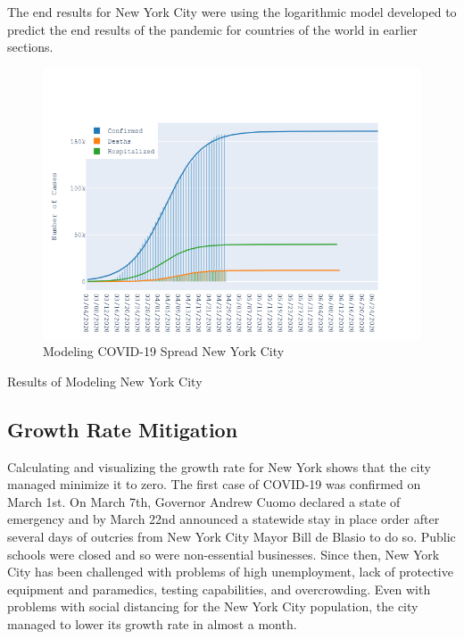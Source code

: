 \documentclass{homework}
\begin{document}
The end results for New York City were using the logarithmic model developed to predict the end results of the pandemic for countries of the world in earlier sections. 

\begin{figure}[H]
  \centering
  \includegraphics[scale=0.45]{task5/modeling.png}
  \caption{Modeling COVID-19 Spread New York City}
\end{figure}

\begin{table}[H]
  \caption{Results of Modeling New York City}
  \label{Task 5 New York City}
  \centering
  
\end{table}

\newpage
\subsection{Growth Rate Mitigation} 

Calculating and visualizing the growth rate for New York shows that the city managed minimize it to zero. The first case of COVID-19 was confirmed on March 1st. On March 7th, Governor Andrew Cuomo declared a state of emergency and by March 22nd announced a statewide stay in place order after several days of outcries from New York City Mayor Bill de Blasio to do so. Public schools were closed and so were non-essential businesses. Since then, New York City has been challenged with problems of high unemployment, lack of protective equipment and paramedics, testing capabilities, and overcrowding. Even with problems with social distancing for the New York City population, the city managed to lower its growth rate in almost a month. 
\end{document}
